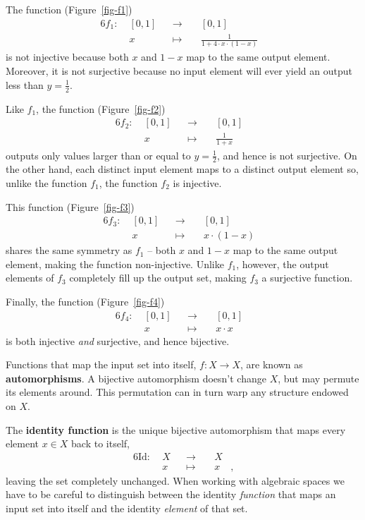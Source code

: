 \documentclass[
  letterpaper,
  DIV=11,
  numbers=noendperiod]{scrartcl}
\begin{document}
The function (Figure~\ref{fig-f1}) \begin{alignat*}{6}
f_1 :\; & [0, 1] & &\rightarrow& \; & [0, 1] &
\\
& x & &\mapsto& & \frac{1}{1 + 4 \cdot x \cdot (1 - x)} &
\end{alignat*} is not injective because both \(x\) and \(1 - x\) map to
the same output element. Moreover, it is not surjective because no input
element will ever yield an output less than \(y = \frac{1}{2}\).

Like \(f_1\), the function (Figure~\ref{fig-f2}) \begin{alignat*}{6}
f_2 :\; & [0, 1] & &\rightarrow& \; & [0, 1] &
\\
& x & &\mapsto& & \frac{1}{1 + x} &
\end{alignat*} outputs only values larger than or equal to
\(y = \frac{1}{2}\), and hence is not surjective. On the other hand,
each distinct input element maps to a distinct output element so, unlike
the function \(f_1\), the function \(f_2\) is injective.

This function (Figure~\ref{fig-f3}) \begin{alignat*}{6}
f_3 :\; & [0, 1] & &\rightarrow& \; & [0, 1] &
\\
& x & &\mapsto& & x \cdot (1 - x) &
\end{alignat*} shares the same symmetry as \(f_1\) -- both \(x\) and
\(1 - x\) map to the same output element, making the function
non-injective. Unlike \(f_1\), however, the output elements of \(f_3\)
completely fill up the output set, making \(f_3\) a surjective function.

Finally, the function (Figure~\ref{fig-f4}) \begin{alignat*}{6}
f_4 :\; & [0, 1] & &\rightarrow& \; & [0, 1] &
\\
& x & &\mapsto& & x \cdot x &
\end{alignat*} is both injective \emph{and} surjective, and hence
bijective.

Functions that map the input set into itself, \(f : X \rightarrow X\),
are known as \textbf{automorphisms}. A bijective automorphism doesn't
change \(X\), but may permute its elements around. This permutation can
in turn warp any structure endowed on \(X\).

The \textbf{identity function} is the unique bijective automorphism that
maps every element \(x \in X\) back to itself, \begin{alignat*}{6}
\text{Id} :\; & X & &\rightarrow& \; & X &
\\
& x & &\mapsto& & x &,
\end{alignat*} leaving the set completely unchanged. When working with
algebraic spaces we have to be careful to distinguish between the
identity \emph{function} that maps an input set into itself and the
identity \emph{element} of that set.
\end{document}
